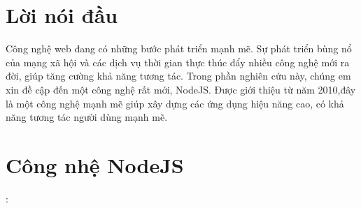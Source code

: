 \documentclass[a4paper,12pt]{report}
\begin{document}
    \newpage

    \tableofcontents
    \newpage
\chapter{Lời nói đầu}
   Công nghệ web đang có những bước phát triển mạnh mẽ. Sự phát triển bùng nổ của mạng xã hội và các dịch vụ thời gian thực thúc đẩy nhiều công nghệ mới ra đời,
   giúp tăng cường khả năng tương tác. Trong phần nghiên cứu này, chúng em xin đề cập đến một công nghệ rất mới, NodeJS. Được giới thiệu từ năm 2010,đây là một
   công nghệ mạnh mẽ giúp xây dựng các ứng dụng hiệu năng cao, có khả năng tương tác người dùng mạnh mẽ.



\chapter{Công nhệ NodeJS}:
\end{document}
